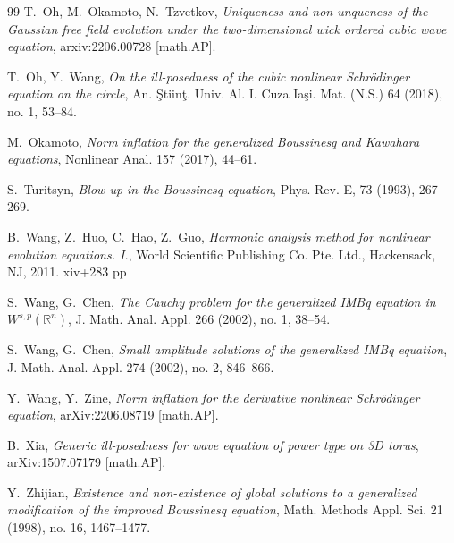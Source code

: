 \documentclass[letterpaper, 11pt,  reqno]{amsart}
\newcommand{\1}{\hspace{0.5mm}\text{I}\hspace{0.5mm}}
\newcommand{\R}{\mathbb{R}}
\numberwithin{equation}{section}
\numberwithin{theorem}{section}
\begin{document}
\begin{thebibliography}{99}
T.~Oh, M.~Okamoto, N.~Tzvetkov,
{\it Uniqueness and non-unqueness of the Gaussian free field evolution under the two-dimensional wick ordered cubic wave equation},
arxiv:2206.00728 [math.AP].

T.~Oh, Y.~Wang, 
{\it On the ill-posedness of the cubic nonlinear Schrödinger equation on the circle}, 
An. Ştiinţ. Univ. Al. I. Cuza Iaşi. Mat. (N.S.) 64 (2018), no. 1, 53–84.

M.~Okamoto, 
{\it Norm inflation for the generalized Boussinesq and Kawahara equations},
Nonlinear Anal. 157 (2017), 44–61.

S.~Turitsyn,
{\it Blow-up in the Boussinesq equation},
Phys. Rev. E, 73 (1993), 267--269.

B.~Wang, Z.~Huo, C.~Hao, Z.~Guo,
{\it Harmonic analysis method for nonlinear evolution equations. I.},
World Scientific Publishing Co. Pte. Ltd., Hackensack, NJ, 2011. xiv+283 pp

S.~Wang, G.~Chen, 
{\it The Cauchy problem for the generalized IMBq equation in $W^{s,p}(\R^n)$},
J. Math. Anal. Appl. 266 (2002), no. 1, 38–54.

S.~Wang, G.~Chen, 
{\it Small amplitude solutions of the generalized IMBq equation},
J. Math. Anal. Appl. 274 (2002), no. 2, 846--866.

Y.~Wang, Y.~Zine,
{\it Norm inflation for the derivative nonlinear Schr\"odinger equation},
arXiv:2206.08719 [math.AP].

B.~Xia, 
{\it Generic ill-posedness for wave equation of power type on 3D torus}, 
arXiv:1507.07179 [math.AP].

Y.~Zhijian, 
{\it Existence and non-existence of global solutions to a generalized modification of the improved Boussinesq equation},
Math. Methods Appl. Sci. 21 (1998), no. 16, 1467–1477.

\end{thebibliography}
\end{document}
